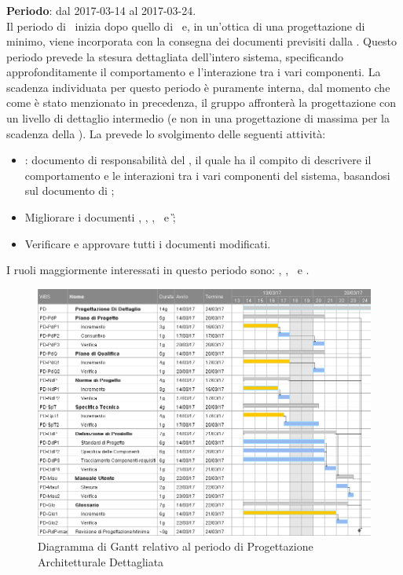 		\subsubsection{\PD}
		\textbf{Periodo}: dal 2017-03-14 al 2017-03-24.\\
		Il periodo di \PD\ inizia dopo quello di \PA\ e, in un'ottica di una progettazione di minimo, viene incorporata con la consegna dei documenti previsiti dalla \RQ. Questo periodo prevede la stesura dettagliata dell’intero sistema, specificando approfonditamente il comportamento e l’interazione tra i vari componenti. La scadenza individuata per questo periodo è puramente interna, dal momento che come è stato menzionato in precedenza, il gruppo \gruppo affronterà la progettazione con un livello di dettaglio intermedio (e non in una progettazione di massima per la scadenza della \RP).
		La \PD prevede lo svolgimento delle seguenti attività:
		\begin{itemize}
			\item \textit{\DDP}: documento di responsabilità del \textit{\Prog}, il quale ha il compito di descrivere il comportamento	e le interazioni tra i vari componenti del sistema, basandosi sul documento di \ST;
			\item  Migliorare i documenti \NdP, \PdP, \PdQ, \ST\ e \G;
			\item Verificare e approvare tutti i documenti modificati.
		\end{itemize}
		I ruoli maggiormente interessati in questo periodo sono: \textit{\Amm}, \textit{\Res}, \textit{\Prog}\ e \textit{\Ver}.
		
		\begin{figure}[ht]
			\centering
			\includegraphics[scale=0.43]{img/ganttnetbreak4.png}
			\caption{Diagramma di Gantt relativo al periodo di Progettazione Architetturale Dettagliata}
		\end{figure}
		\FloatBarrier
		

